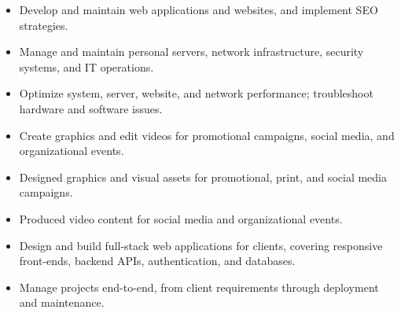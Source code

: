 \begin{itemize} \item Develop and maintain web applications and websites, and implement SEO strategies. \item Manage and maintain personal servers, network infrastructure, security systems, and IT operations. \item Optimize system, server, website, and network performance; troubleshoot hardware and software issues. \item Create graphics and edit videos for promotional campaigns, social media, and organizational events. \end{itemize}

\divider

\begin{itemize}
    \item Designed graphics and visual assets for promotional, print, and social media campaigns.
    \item Produced video content for social media and organizational events.
\end{itemize}

\divider

\begin{itemize}
    \item Design and build full-stack web applications for clients, covering responsive front-ends, backend APIs, authentication, and databases.
    \item Manage projects end-to-end, from client requirements through deployment and maintenance.
\end{itemize}
\vspace{4mm}